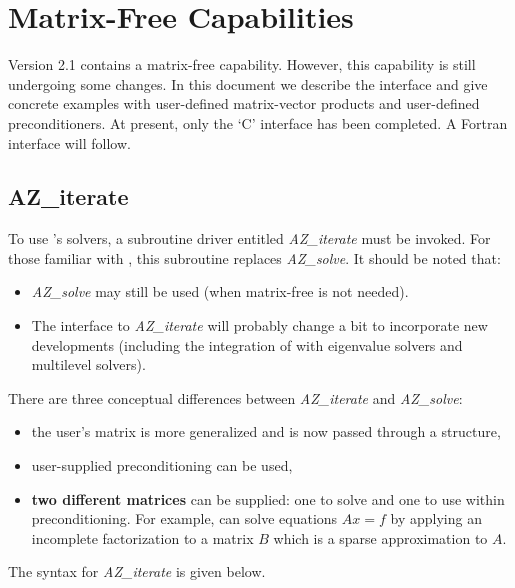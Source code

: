 \section{Matrix-Free Capabilities \label{matrix.free}}
Version 2.1 contains a matrix-free capability.  However, 
this capability is still undergoing some changes. 
In this document we describe the \Az{} interface
and give concrete examples with user-defined matrix-vector
products and user-defined preconditioners.
At present, only the `C' interface
has been completed. A Fortran interface will follow.

\subsection{{ AZ\_iterate}\label{interface}}

To use \Az{}'s solvers, a subroutine driver entitled {\it AZ\_iterate}
must be invoked. For those familiar with , this subroutine
replaces {\it AZ\_solve}. It should be noted that:
\begin{itemize}
\item {\it AZ\_solve} may still be used (when matrix-free is not needed).
\item The interface to {\it AZ\_iterate} will probably change a bit to
      incorporate new developments (including the integration of \Az{}
      with eigenvalue solvers and multilevel solvers).
\end{itemize}
There are three conceptual differences between {\it AZ\_iterate} and 
{\it AZ\_solve}:
\begin{itemize}
\item the user's matrix is more generalized and is now passed through a structure,
\item user-supplied preconditioning can be used,
\item {\bf two different matrices} can be supplied: one to solve
      and one to use within preconditioning. For example, \Az{}
      can solve equations $A x = f $ by applying an incomplete 
      factorization to a matrix $B$ which is 
      a sparse approximation to $A$.
\end{itemize}
The syntax for {\it AZ\_iterate} is given below.
%

